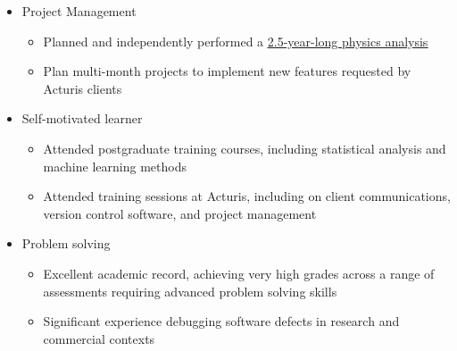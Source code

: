 \documentclass[a4paper]{article}
\newcommand\link[2]{{\color{hl}\uline{\href{#1}{#2}}}}
\newcommand\intersectionspacing{0.3em}
\newcommand\thesislink[1]{https://raw.githubusercontent.com/hacooke/thesis/refs/heads/master/thesis.pdf\#page=#1}
\begin{document}
{\begin{itemize}
\begin{itemize}
      \end{itemize}
      \item Project Management
      \begin{itemize}
        \item Planned and independently performed a
          \link{\thesislink{150}}{2.5-year-long physics analysis}
        \item Plan multi-month projects to implement new features requested by
          Acturis clients
      \end{itemize}
      \item Self-motivated learner
      \begin{itemize}
        \item Attended postgraduate training courses, including
          statistical analysis and machine learning methods
        \item Attended training sessions at Acturis, including
          on client communications, version control software, and project management
      \end{itemize}
      \item Problem solving
      \begin{itemize}
        \item Excellent academic record, achieving very high grades across a
          range of assessments requiring advanced problem solving skills
        \item Significant experience debugging software defects in research
          and commercial contexts
      \end{itemize}
    \end{itemize}
}\\[\intersectionspacing]%
\end{document}
